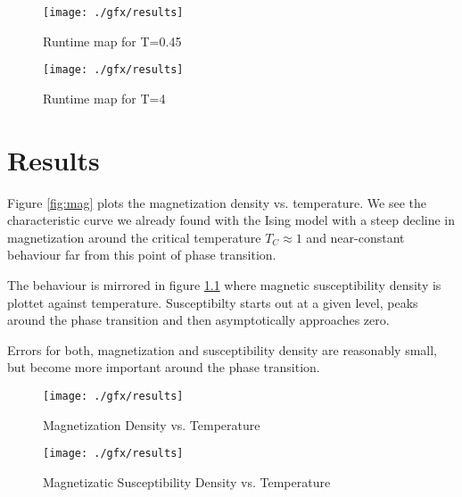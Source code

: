 \begin{figure}
	\texttt{[image: ./gfx/results]}
	\caption{Runtime map for T=0.45} \label{fig:runtimeT1}
	\texttt{[image: ./gfx/results]}
	\caption{Runtime map for T=4} \label{fig:runtimeT4}
\end{figure}

\chapter{Results}
Figure \ref{fig:mag} plots the magnetization density vs. temperature. We see the characteristic curve we already found with the Ising model with a steep decline in magnetization around the critical temperature $T_C \approx 1$ and near-constant behaviour far from this point of phase transition.

The behaviour is mirrored in figure \ref{fig:chi} where magnetic susceptibility density is plottet against temperature. Susceptibilty starts out at a given level, peaks around the phase transition and then asymptotically approaches zero.

Errors for both, magnetization and susceptibility density are reasonably small, but become more important around the phase transition.

\begin{figure}
	\texttt{[image: ./gfx/results]}
	\caption{Magnetization Density vs. Temperature} \label{fig:mag}
	\texttt{[image: ./gfx/results]}
	\caption{Magnetizatic Susceptibility Density vs. Temperature} \label{fig:chi}
\end{figure}